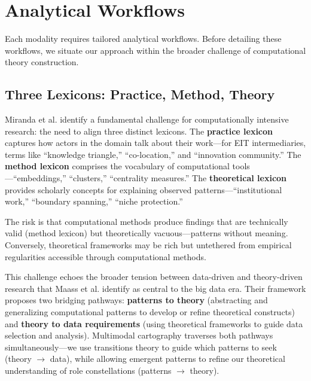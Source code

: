 \documentclass[../main.tex]{subfiles}
\begin{document}
\section{Analytical Workflows}

Each modality requires tailored analytical workflows. Before detailing these workflows, we situate our approach within the broader challenge of computational theory construction.

\subsection{Three Lexicons: Practice, Method, Theory}

Miranda et al. \citeyear{miranda2022computationally} identify a fundamental challenge for computationally intensive research: the need to align three distinct lexicons. The \textbf{practice lexicon} captures how actors in the domain talk about their work---for EIT intermediaries, terms like ``knowledge triangle,'' ``co-location,'' and ``innovation community.'' The \textbf{method lexicon} comprises the vocabulary of computational tools---``embeddings,'' ``clusters,'' ``centrality measures.'' The \textbf{theoretical lexicon} provides scholarly concepts for explaining observed patterns---``institutional work,'' ``boundary spanning,'' ``niche protection.''

The risk is that computational methods produce findings that are technically valid (method lexicon) but theoretically vacuous---patterns without meaning. Conversely, theoretical frameworks may be rich but untethered from empirical regularities accessible through computational methods.

This challenge echoes the broader tension between data-driven and theory-driven research that Maass et al. \citeyear{maass2018data} identify as central to the big data era. Their framework proposes two bridging pathways: \textbf{patterns to theory} (abstracting and generalizing computational patterns to develop or refine theoretical constructs) and \textbf{theory to data requirements} (using theoretical frameworks to guide data selection and analysis). Multimodal cartography traverses both pathways simultaneously---we use transitions theory to guide which patterns to seek (theory $\rightarrow$ data), while allowing emergent patterns to refine our theoretical understanding of role constellations (patterns $\rightarrow$ theory).
\end{document}

